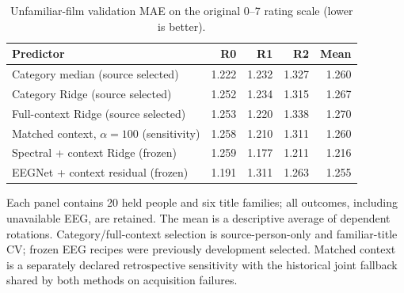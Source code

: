 \begin{table}[tbp]
\centering
\small
\caption{Unfamiliar-film validation MAE on the original 0--7 rating scale (lower is better).}
\label{tab:primary}
\begin{tabular}{lrrrr}
\toprule
Predictor & R0 & R1 & R2 & Mean \\
\midrule
Category median (source selected) & 1.222 & 1.232 & 1.327 & 1.260 \\
Category Ridge (source selected) & 1.252 & 1.234 & 1.315 & 1.267 \\
Full-context Ridge (source selected) & 1.253 & 1.220 & 1.338 & 1.270 \\
Matched context, $\alpha=100$ (sensitivity) & 1.258 & 1.210 & 1.311 & 1.260 \\
Spectral + context Ridge (frozen) & 1.259 & 1.177 & 1.211 & 1.216 \\
EEGNet + context residual (frozen) & 1.191 & 1.311 & 1.263 & 1.255 \\
\bottomrule
\end{tabular}
\par\medskip\begin{minipage}{0.97\linewidth}\footnotesize Each panel contains 20 held people and six title families; all outcomes, including unavailable EEG, are retained. The mean is a descriptive average of dependent rotations. Category/full-context selection is source-person-only and familiar-title CV; frozen EEG recipes were previously development selected. Matched context is a separately declared retrospective sensitivity with the historical joint fallback shared by both methods on acquisition failures.\end{minipage}
\end{table}
